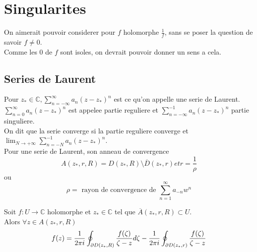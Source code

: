 \documentclass[../main.tex]{subfiles}
\begin{document}
\section{Singularites}	
On aimerait pouvoir considerer pour $f$ holomorphe $\frac{1}{f}$, sans se poser la question de savoir $f\neq 0$.\\
Comme les $0$ de $f$ sont isoles, on devrait pouvoir donner un sens a cela.\\
\subsection{Series de Laurent}
Pour $z_*\in \mathbb{C}, \sum_{n= - \infty }^{ \infty } a_n ( z-z_*)^{n}$ est ce qu'on appelle une serie de Laurent.\\
$ \sum_{n=0}^{ \infty } a_n ( z-z_*) ^{n}$ est appelee partie reguliere et
$ \sum_{n= - \infty }^{ -1}a_n ( z-z_*) ^{n}$ partie singuliere.\\
On dit que la serie converge si la partie reguliere converge et $ \lim_{N \to  + \infty} \sum_{n=-N}^{ -1}a_n ( z-z_*) ^{n}$.\\
Pour une serie de Laurent, son anneau de convergence
\[ 
A( z_*, r, R) = D( z_*, R) \setminus \overline{D}( z_*, r) et r=\frac{1}{\rho}
\]
ou 
\[ 
\rho= \text{ rayon de convergence de  } \sum_{n=1}^{ \infty } a_{-n} w^{n}
\]
\begin{propo}
Soit $f:U\to \mathbb{C}$ holomorphe et $z_*\in \mathbb{C}$ tel que $\overline{A}( z_*, r, R) \subset U$.\\
Alors $\forall z \in A( z_*, r,R) $ 
\[ 
f( z) = \frac{1}{2\pi i} \oint_{\partial D( z_*,R) } \frac{f( \zeta) }{\zeta-z} d\zeta- \frac{1}{2\pi i}\oint_{\partial D( z_*,r) } \frac{f( \zeta) }{\zeta-z}
\]

\end{propo}


			

	
		
\end{document}
